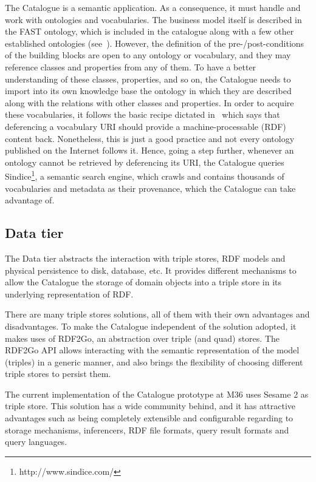 \documentclass{fast_latex}
\begin{document}
The Catalogue is a semantic application. As a consequence, it must handle and work with ontologies and vocabularies. The business model itself is described in the FAST ontology, which is included in the catalogue along with a few other established ontologies (see~\cite{moeller2011fast_ontology}). However, the definition of the pre-/post-conditions of the building blocks are open to any ontology or vocabulary, and they may reference classes and properties from any of them. To have a better understanding of these classes, properties, and so on, the Catalogue needs to import into its own knowledge base the ontology in which they are described along with the relations with other classes and properties. In order to acquire these vocabularies, it follows the basic recipe dictated in~\cite{berrueta2008} which says that deferencing a vocabulary URI should provide a machine-processable (RDF) content back. Nonetheless, this is just a good practice and not every ontology published on the Internet follows it. Hence, going a step further, whenever an ontology cannot be retrieved by deferencing its URI, the Catalogue queries Sindice\footnote{http://www.sindice.com/}, a semantic search engine, which crawls and contains thousands of vocabularies and metadata as their provenance, which the Catalogue can take advantage of.


\subsection{Data tier}

The Data tier abstracts the interaction with triple stores, RDF models and physical persistence to disk, database, etc. It provides different mechanisms to allow the Catalogue the storage of domain objects into a triple store in its underlying representation of RDF.

There are many triple stores solutions, all of them with their own advantages and disadvantages. To make the Catalogue independent of the solution adopted, it makes uses of RDF2Go, an abstraction over triple (and quad) stores. The RDF2Go API allows interacting with the semantic representation of the model (triples) in a generic manner, and also brings the flexibility of choosing different triple stores to persist them.

The current implementation of the Catalogue prototype at M36 uses Sesame 2 as triple store. This solution has a wide community behind, and it has attractive advantages such as being completely extensible and configurable regarding to storage mechanisms, inferencers, RDF file formats, query result formats and query languages.
\end{document}
